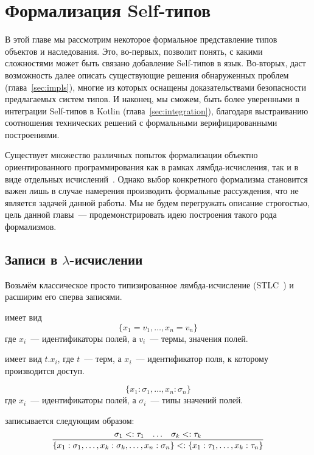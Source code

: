\section{Формализация Self-типов} \label{sec:theory}

В этой главе мы рассмотрим некоторое формальное представление типов объектов и наследования.
Это, во-первых, позволит понять, с какими сложностями может быть связано добавление Self-типов в язык.
Во-вторых, даст возможность далее описать существующие решения обнаруженных проблем (глава~\ref{sec:impls}), многие из которых оснащены доказательствами безопасности предлагаемых систем типов.
И наконец, мы сможем, быть более уверенными в интеграции Self-типов в Kotlin (глава~\ref{sec:integration}), благодаря выстраиванию соотношения технических решений с формальными верифицированными построениями.

Существует множество различных попыток формализации объектно ориентированного программирования как в рамках лямбда-исчисления, так и в виде отдельных исчислений~\cite{pierce2002types}.
Однако выбор конкретного формализма становится важен лишь в случае намерения производить формальные рассуждения, что не является задачей данной работы.
Мы не будем перегружать описание строгостью, цель данной главы~--- продемонстрировать идею построения такого рода формализмов.


\subsection{Записи в $\lambda$-исчислении} \label{subsec:records}

Возьмём классическое просто типизированное лямбда-исчисление (STLC~\cite{pierce2002types}) и расширим его сперва записями.

 имеет вид \[\{x_1 = v_1,\ldots,x_n = v_n\}\] где $x_i$~--- идентификаторы полей, а $v_i$~--- термы, значения полей.

 имеет вид $t.x_i$, где $t$~--- терм, а $x_i$~--- идентификатор поля, к которому производится доступ.

 \[\{x_1 : \sigma_1,\ldots,x_n : \sigma_n\}\] где $x_i$~--- идентификаторы полей, а $\sigma_i$~--- типы значений полей.

 записывается следующим образом:
\begin{equation}
    \label{eq:record-subtype}
    \infer{
        \{x_1 : \sigma_1, \ldots, x_k : \sigma_k, \ldots, x_n : \sigma_n\}
        <:
        \{x_1 : \tau_1, \ldots, x_k : \tau_n\}
    }{\sigma_1 <: \tau_1 & \ldots & \sigma_k <: \tau_k}
\end{equation}

